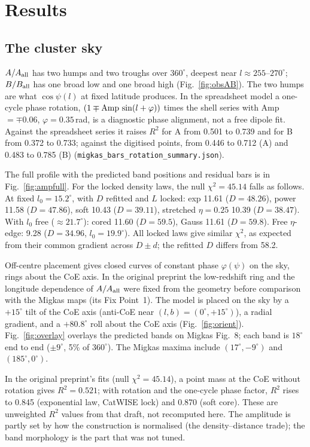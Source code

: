 \documentclass[10pt,twocolumn]{article}
\begin{document}
\section{Results}\label{sec:results}
\subsection{The cluster sky}\label{sec:rings}
$A/A_{\rm all}$ has two humps and two troughs over $360^\circ$, deepest near $l\approx255$--$270^\circ$; $B/B_{\rm all}$ has one broad low and one broad high (Fig.~\ref{fig:obsAB}). The two humps are what $\cos\psi(l)$ at fixed latitude produces. In the spreadsheet model a one-cycle phase rotation, $(1\mp{\rm Amp}\,\sin(l+\varphi))$ times the shell series with Amp $=\mp0.06$, $\varphi=0.35$\,rad, is a diagnostic phase alignment, not a free dipole fit. Against the spreadsheet series it raises $R^2$ for A from 0.501 to 0.739 and for B from 0.372 to 0.733; against the digitised points, from 0.446 to 0.712 (A) and 0.483 to 0.785 (B) (\texttt{migkas\_bars\_rotation\_summary.json}).

The full profile with the predicted band positions and residual bars is in Fig.~\ref{fig:ampfull}. For the locked density laws, the null $\chi^2=45.14$ falls as follows. At fixed $l_0=15.2^\circ$, with $D$ refitted and $L$ locked: exp 11.61 ($D=48.26$), power 11.58 ($D=47.86$), soft 10.43 ($D=39.11$), stretched $\eta{=}0.25$ 10.39 ($D=38.47$). With $l_0$ free ($\approx21.7^\circ$): cored 11.60 ($D=59.5$), Gauss 11.61 ($D=59.8$). Free $\eta$-edge: 9.28 ($D=34.96$, $l_0=19.9^\circ$). All locked laws give similar $\chi^2$, as expected from their common gradient across $D\pm d$; the refitted $D$ differs from 58.2.

Off-centre placement gives closed curves of constant phase $\varphi(\psi)$ on the sky, rings about the CoE axis. In the original preprint the low-redshift ring and the longitude dependence of $A/A_{\rm all}$ were fixed from the geometry before comparison with the Migkas maps (its Fix Point~1). The model is placed on the sky by a $+15^\circ$ tilt of the CoE axis (anti-CoE near $(l,b)=(0^\circ,+15^\circ)$), a radial gradient, and a $+80.8^\circ$ roll about the CoE axis (Fig.~\ref{fig:orient}). Fig.~\ref{fig:overlay} overlays the predicted bands on Migkas Fig.~8; each band is $18^\circ$ end to end ($\pm9^\circ$, 5\% of $360^\circ$). The Migkas maxima include $(17^\circ,-9^\circ)$ and $(185^\circ,0^\circ)$.

In the original preprint's fits (null $\chi^2=45.14$), a point mass at the CoE without rotation gives $R^2=0.521$; with rotation and the one-cycle phase factor, $R^2$ rises to 0.845 (exponential law, CatWISE lock) and 0.870 (soft core). These are unweighted $R^2$ values from that draft, not recomputed here. The amplitude is partly set by how the construction is normalised (the density--distance trade); the band morphology is the part that was not tuned.
\end{document}
